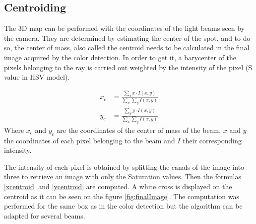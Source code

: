 \subsection{Centroiding}

The 3D map can be performed with the coordinates of the light beams seen by the camera. They are determined by estimating the center of the spot, and to do so, the center of mass, also called the centroid needs to be calculated in the final image acquired by the color detection. In order to get it, a barycenter of the pixels belonging to the ray is carried out weighted by the intensity of the pixel (S value in HSV model).

\begin{align}
x_c &= \frac{\sum_x x \cdot I(x,y)}{\sum_x \sum_y I(x,y)} \label{xcentroid} \\
y_c &= \frac{\sum_y y \cdot I(x,y)}{\sum_x \sum_y I(x,y)} \label{ycentroid}
\end{align}
Where $x_c$ and $y_c$ are the coordinates of the center of mass of the beam, $x$ and $y$ the coordinates of each pixel belonging to the beam and $I$ their corresponding intensity.

The intensity of each pixel is obtained by splitting the canals of the image into three to retrieve an image with only the Saturation values. Then the formulas \eqref{xcentroid} and \eqref{ycentroid} are computed. A white cross is displayed on the centroid as it can be seen on the figure \ref{fig:finalImage}. The computation was performed for the same box as in the color detection but the algorithm can be adapted for several beams.